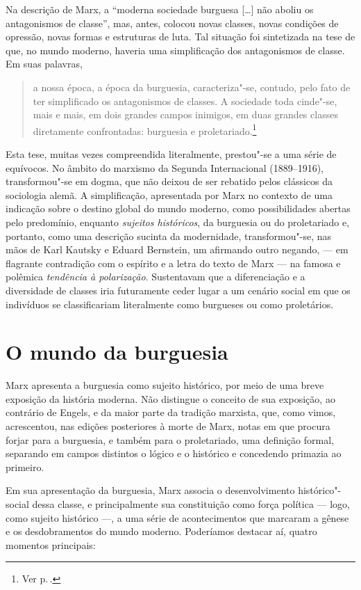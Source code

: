 Na descrição de Marx, a ``moderna sociedade burguesa [\ldots{}] não aboliu os
antagonismos de classe'', mas, antes, colocou novas classes, novas
condições de opressão, novas formas e estruturas de luta. Tal situação
foi sintetizada na tese de que, no mundo moderno, haveria uma
simplificação dos antagonismos de classe. Em suas palavras, 

\begin{quote} 
a nossa época, a época da burguesia, caracteriza"-se, contudo, pelo
fato de ter simplificado os antagonismos de classes. A sociedade toda
cinde"-se, mais e mais, em dois grandes campos inimigos, em duas
grandes classes diretamente confrontadas: burguesia e proletariado.\footnote{Ver p.\,\pageref{1}.}
\end{quote} 

Esta tese, muitas vezes compreendida literalmente, prestou"-se a uma
série de equívocos. No âmbito do marxismo da Segunda Internacional (1889--1916),
transformou"-se em dogma, que não deixou de ser rebatido pelos
clássicos da sociologia alemã. A simplificação, apresentada por Marx
no contexto de uma indicação sobre o destino global do mundo moderno,
como possibilidades abertas pelo predomínio, enquanto \textit{sujeitos
históricos}, da burguesia ou do proletariado e, portanto, como uma
descrição sucinta da modernidade, transformou"-se, nas mãos de Karl
Kautsky e Eduard Bernstein, um afirmando outro negando, --- em flagrante
contradição com o espírito e a letra do texto de Marx --- na famosa e
polêmica \textit{tendência à polarização}. Sustentavam que a diferenciação e a
diversidade de classes iria futuramente ceder lugar a um cenário social
em que os indivíduos se classificariam literalmente como burgueses
ou como proletários.

\section*{O mundo da burguesia}

Marx apresenta a burguesia como sujeito histórico, por meio de uma breve
exposição da história moderna. Não distingue o conceito de sua
exposição, ao contrário de Engels, e da maior parte da tradição
marxista, que, como vimos, acrescentou, nas edições posteriores à morte
de Marx, notas em que procura forjar para a burguesia, e também para o
proletariado, uma definição formal, separando em campos distintos o
lógico e o histórico e concedendo primazia ao primeiro.

Em sua apresentação da burguesia, Marx associa o desenvolvimento
histórico"-social dessa classe, e principalmente sua constituição como
força política --- logo, como sujeito histórico ---, a uma série de
acontecimentos que marcaram a gênese e os desdobramentos do mundo
moderno. Poderíamos destacar aí, quatro momentos principais: 

